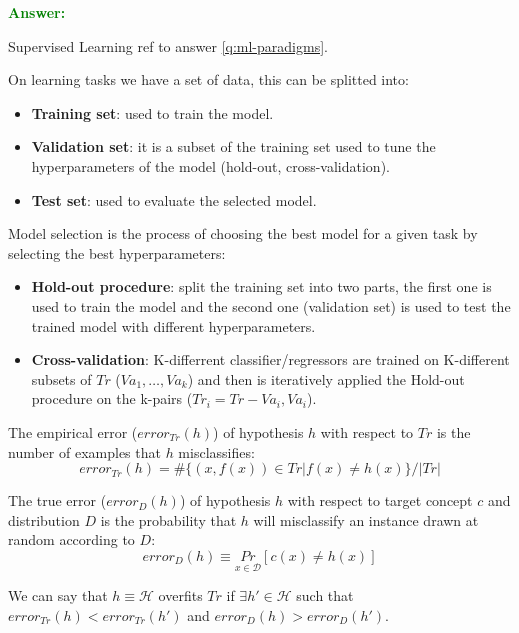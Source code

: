 \documentclass[12pt]{article}
\begin{document}
\begin{enumerate}[label=\textbf{ML.\arabic*}]
    \textcolor{green}{\textbf{Answer:}}

    Supervised Learning ref to answer \ref{q:ml-paradigms}.
    
    On learning tasks we have a set of data, this can be splitted into:
    \begin{itemize}
        \item \textbf{Training set}: used to train the model.
        \item \textbf{Validation set}: it is a subset of the training set used to tune the hyperparameters of the model (hold-out, cross-validation).
        \item \textbf{Test set}: used to evaluate the selected model.
    \end{itemize}

    Model selection is the process of choosing the best model for a given task by selecting the best hyperparameters:
    \begin{itemize}
        \item \textbf{Hold-out procedure}: split the training set into two parts, the first one is used to train the model and
        the second one (validation set) is used to test the trained model with different hyperparameters.
        \item \textbf{Cross-validation}: K-differrent classifier/regressors are trained on K-different subsets of $Tr$ ($Va_1,\ldots,Va_k$)
        and then is iteratively applied the Hold-out procedure on the k-pairs ($Tr_i=Tr-Va_i,Va_i$).
    \end{itemize}

    The empirical error ($error_{Tr}(h)$) of hypothesis $h$ with respect to $Tr$ is the number of examples that $h$ misclassifies:
    \begin{equation}\label{eq:empirical_error}
        error_{Tr}(h) = \#\{(x,f(x)) \in Tr|f(x)\neq h(x)\}/|Tr|
    \end{equation}

    The true error ($error_D(h)$) of hypothesis $h$ with respect to target concept $c$ and distribution $D$ is the probability that $h$ will misclassify an instance drawn at random according to $D$:
    \begin{equation}\label{eq:true_error}
        error_D(h) \equiv \underset{x\in\mathcal{D}}{Pr}[c(x)\neq h(x)]
    \end{equation}

    We can say that $h\equiv\mathcal{H}$ overfits $Tr$ if $\exists h'\in\mathcal{H}$ such that $error_{Tr}(h)<error_{Tr}(h')$ and $error_D(h)>error_D(h')$.


\end{enumerate}
\end{document}
